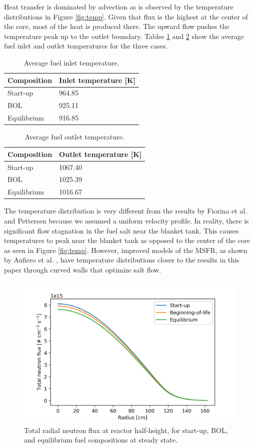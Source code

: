 \documentclass{anstrans}
\begin{document}
{	Heat transfer is dominated by advection as is observed by the temperature
	distributions in Figure \ref{fig:temp}. Given that flux is the highest
	at the center of the core, most of the heat is produced there. The upward
	flow pushes the temperature peak up to the outlet boundary. Tables
	\ref{table:inlet} and \ref{table:outlet} show the average
	fuel inlet and outlet temperatures for the three cases.
%	
\begin{table}[H]
	\centering
	\captionsetup{justification=centering}
	\caption{Average fuel inlet temperature.}
	\begin{tabular}{ll}
		\hline
		{Composition} & {Inlet temperature [K]}\\
		\hline
		Start-up & 964.85\\
		\gls{BOL} & 925.11\\
		Equilibrium & 916.85\\
		\hline
	\end{tabular}
	\label{table:inlet}
\end{table}	
%
\begin{table}[H]
	\centering
	\captionsetup{justification=centering}
	\caption{Average fuel outlet temperature.}
	\begin{tabular}{ll}
		\hline
		{Composition} & {Outlet temperature [K]}\\
		\hline
		Start-up & 1067.40\\
		\gls{BOL} & 1025.39\\
		Equilibrium & 1016.67\\
		\hline
	\end{tabular}
	\label{table:outlet}
\end{table}	

	The temperature distribution is very different from the results by Fiorina
	et al. \cite{fiorina_modelling_2014} and Pettersen
	\cite{pettersen_coupled_2016} because we assumed a uniform velocity
	profile. In reality, there is significant flow stagnation in the fuel salt
	near the blanket tank. This causes temperatures to peak near the blanket
	tank as opposed to the center of the core as seen in Figure \ref{fig:temp}.
	However, improved models of the \gls{MSFR}, as shown by Aufiero et al.
	\cite{aufiero_development_2014}, have temperature distributions closer to
	the results in this paper through curved walls that optimize salt flow.
	
\begin{figure}[H] 
	\centering
	\includegraphics[width=.48\textwidth]{./figures/totalflux}
	\captionsetup{justification=centering}
	\caption{Total radial neutron flux at reactor half-height, for start-up,
	\gls{BOL}, and equilibrium fuel compositions at steady state.}
	\label{fig:totalflux}
\end{figure} 

}
\end{document}
